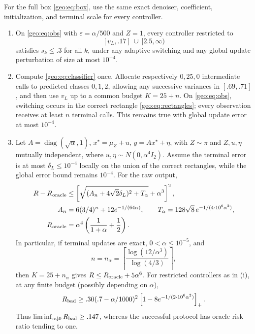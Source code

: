 \begin{theorem}\label{geo:thm:main}
For the full box \eqref{geo:eq:box}, use the same exact denoiser, coefficient,
initialization, and terminal scale for every controller.
\begin{enumerate}
\item On \eqref{geo:eq:obs} with $\varepsilon=\alpha/500$ and $Z=1$, every controller
restricted to
\begin{equation}\label{geo:eq:newbad}
 [v_L,.17]\ \cup\ [2.5,\infty)
\end{equation}
satisfies $s_k\le.3$ for all $k$, under any adaptive switching and any
global update perturbation of size at most $10^{-4}$.
\item Compute \eqref{geo:eq:classifier} once. Allocate respectively $0,25,0$
intermediate calls to predicted classes $0,1,2$, allowing any successive
variances in $[.69,.71]$, and then use $v_L$ up to a common budget $K=25+n$.
On \eqref{geo:eq:obs}, switching occurs in the correct rectangle
\eqref{geo:eq:rectangles}; every observation receives at least $n$ terminal calls.
This remains true with global update error at most $10^{-4}$.
\item Let $A=\operatorname{diag}(\sqrt\alpha,1)$, $x^\star=\mu_Z+u$, $y=Ax^\star+\eta$,
with $Z\sim\pi$ and $Z,u,\eta$ mutually independent, where
$u,\eta\sim N(0,\alpha^4 I_2)$. Assume the terminal error is at most
$\delta_L\le10^{-4}$ locally on the union of the correct rectangles, while
the global error bound remains $10^{-4}$. For the raw output,
\begin{align}
 R-R_{\rm oracle}
 &\le\left[\sqrt{(A_n+4\sqrt2\delta_L)^2+T_\alpha}+\alpha^3\right]^2,
 \label{geo:eq:fullrisk}\\
 A_n&=6(3/4)^n+12e^{-1/(64\alpha)},\qquad
 T_\alpha=128\sqrt8\,e^{-1/(4\cdot10^6\alpha^2)},\label{geo:eq:Ar}\\
 R_{\rm oracle}&=\alpha^4\left(\frac1{1+\alpha}+\frac12\right).
 \label{geo:eq:oracle}
\end{align}
In particular, if terminal updates are exact, $0<\alpha\le10^{-5}$, and
\begin{equation}\label{geo:eq:ralpha}
 n=n_\alpha=\left\lceil\frac{\log(12/\alpha^3)}{\log(4/3)}\right\rceil,
\end{equation}
then $K=25+n_\alpha$ gives $R\le R_{\rm oracle}+5\alpha^6$.
For restricted controllers as in (i), at any finite budget (possibly depending
on $\alpha$),
\begin{equation}\label{geo:eq:badrisk}
 R_{\rm bad}\ge .30(.7-\alpha/1000)^2
 \left[1-8e^{-1/(2\cdot10^6\alpha^2)}\right]_+.
\end{equation}
Thus $\liminf_{\alpha\downarrow0}R_{\rm bad}\ge.147$, whereas the successful
protocol has oracle risk ratio tending to one.
\end{enumerate}
\end{theorem}

